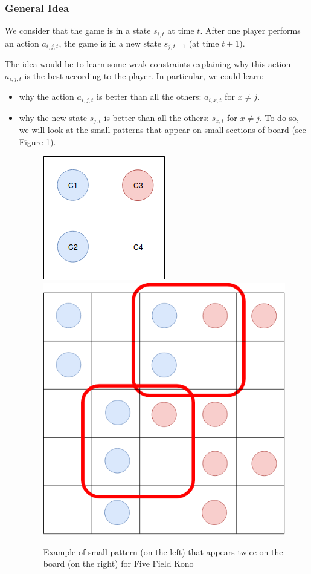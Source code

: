\documentclass[12pt,twoside]{report}
\begin{document}

\subsubsection{General Idea}

We consider that the game is in a state $s_{i,t}$ at time $t$. After one player performs an action $a_{i,j,t}$, the game is in a new state $s_{j,t+1}$ (at time $t+1$).

\smallskip

The idea would be to learn some weak constraints explaining why this action $a_{i,j,t}$ is the best according to the player. In particular, we could learn:
\begin{itemize}
\item why the action $a_{i,j,t}$ is better than all the others: $a_{i,x,t}$ for $x\neq j$. %
\item why the new state $s_{j,t}$ is better than all the others: $s_{x,t}$ for $x\neq j$. To do so, we will look at the small patterns that appear on small sections of board (see Figure \ref{fig:FFK_pattern}). 
\begin{figure}[h]
\centering
\includegraphics[width=0.4\hsize]{figures/FFK_pattern.png}
\hspace{0.1\hsize}
\includegraphics[width = 0.4\hsize]{figures/FFK_include_pattern.png}
\caption{Example of small pattern (on the left) that appears twice on the board (on the right) for Five Field Kono}
\label{fig:FFK_pattern}
\end{figure}

\end{itemize}
\end{document}
